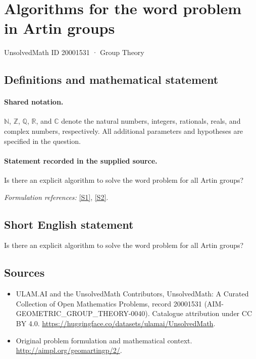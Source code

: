 \documentclass[11pt]{article}
\newcommand{\sref}[2]{\hyperlink{source:#1:#2}{[S#2]}}
\begin{document}
\setcounter{section}{20001530}
\section{Algorithms for the word problem in Artin groups}\label{20001531}
{\small UnsolvedMath ID 20001531 · Group Theory}
\subsection{Definitions and mathematical statement}

\paragraph{Shared notation.}$\mathbb N$, $\mathbb Z$, $\mathbb Q$, $\mathbb R$, and $\mathbb C$ denote the natural numbers, integers, rationals, reals, and complex numbers, respectively. All additional parameters and hypotheses are specified in the question.


\paragraph{Statement recorded in the supplied source.}
Is there an explicit algorithm to solve the word problem for all Artin groups?
\par\smallskip\textit{Formulation references:} \sref{20001531}{1}, \sref{20001531}{2}.
\subsection{Short English statement}
Is there an explicit algorithm to solve the word problem for all Artin groups?
\subsection{Sources}
\begin{itemize}
\item[\hypertarget{source:20001531:1}{S1}] ULAM.AI and the UnsolvedMath Contributors, UnsolvedMath: A Curated Collection of Open Mathematics Problems, record 20001531 (AIM-GEOMETRIC\_GROUP\_THEORY-0040). Catalogue attribution under CC BY 4.0.
\url{https://huggingface.co/datasets/ulamai/UnsolvedMath}.
\item[\hypertarget{source:20001531:2}{S2}] Original problem formulation and mathematical context.
\url{http://aimpl.org/geomartingp/2/}.
\end{itemize}
\label{end:20001531}
\end{document}
